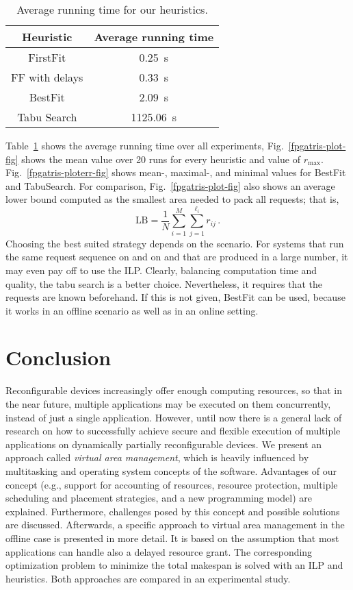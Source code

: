 \documentclass[10pt,journal]{IEEEtran}
\begin{document}
\begin{table}[h]
\centering
\begin{tabular}{|c|c|} \hline
Heuristic & Average running time\\ \hline
FirstFit & 0.25~s\\
FF with delays & 0.33~s\\
BestFit & 2.09~s\\
Tabu Search & 1125.06~s\\ \hline
\end{tabular}
\caption{Average running time for our heuristics.\label{results-tab}}
\end{table}

Table~\ref{results-tab} 
shows the average running time over all experiments, 
Fig.~\ref{fpgatris-plot-fig} shows the mean value over 20 runs for
every heuristic and value of $r_\mathrm{max}$.
Fig.~\ref{fpgatris-ploterr-fig} shows mean-, maximal-, and minimal values
for BestFit and TabuSearch. 
For comparison, Fig.~\ref{fpgatris-plot-fig} also shows an 
average lower bound computed as the smallest area needed to
pack all requests; that is,
$$\mbox{LB} = \frac1N \sum_{i=1}^M \sum_{j=1}^{\ell_i} r_{ij}\,.$$
Choosing the best suited strategy depends on the scenario. For systems
that run the same request sequence on and on and that are produced in a
large number, it may even pay off to use the ILP. Clearly, balancing
computation time and quality, the tabu search is a better choice.
Nevertheless, it requires that the requests are known beforehand.
If this is not given, BestFit can be used, because it works in an
offline scenario as well as in an online setting.


\section{Conclusion}
Reconfigurable devices increasingly offer enough computing resources,
so that in the near future, multiple applications may be executed on
them concurrently, instead of just a single application. However,
until now there is a general lack of research on how to successfully
achieve secure and flexible execution of multiple applications on
dynamically partially reconfigurable devices.  We present an approach
called {\em virtual area management}, which is heavily influenced by
multitasking and operating system concepts of the software. Advantages
of our concept (e.g., support for accounting of resources, resource
protection, multiple scheduling and placement strategies, and a new
programming model) are explained. Furthermore, challenges posed by
this concept and possible solutions are discussed. Afterwards, a
specific approach to virtual area management in the offline case is
presented in more detail. It is based on the assumption that most
applications can handle also a delayed resource grant. The
corresponding optimization problem to minimize the total makespan is
solved with an ILP and heuristics. Both approaches are compared in an
experimental study.
\end{document}
